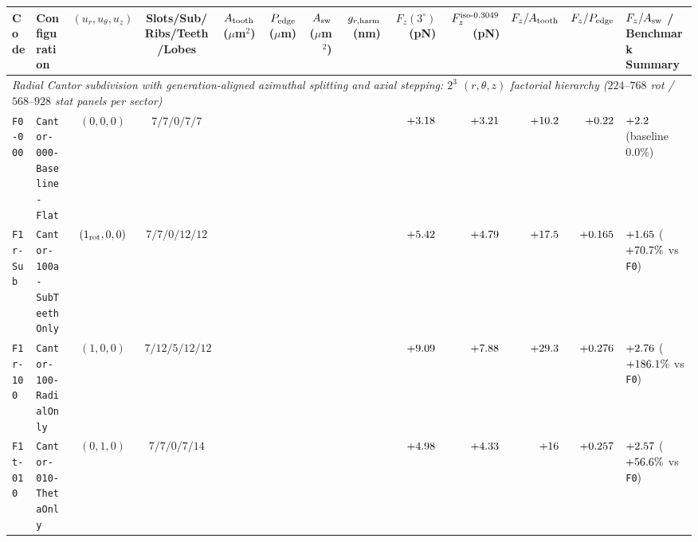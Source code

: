 \begin{table}[!htbp]
{\begin{tabular}{llccrrrrrrrrl}
\toprule
Code & Configuration & $(u_r, u_\theta, u_z)$ & Slots/Sub/Ribs/Teeth/Lobes & $A_{\rm tooth}$ ($\mu$m$^2$) & $P_{\rm edge}$ ($\mu$m) & $A_{\rm sw}$ ($\mu$m$^2$) & $g_{r,\rm harm}$ (nm) & $F_z(3^\circ)$ (pN) & $F_z^{\rm iso\text{-}0.3049}$ (pN) & $F_z/A_{\rm tooth}$ & $F_z/P_{\rm edge}$ & $F_z/A_{\rm sw}$ / Benchmark Summary \\
\midrule
\multicolumn{13}{l}{\emph{Radial Cantor subdivision with generation-aligned azimuthal splitting and axial stepping: $2^3$ $(r, \theta, z)$ factorial hierarchy ($224\text{--}768$ rot / $568\text{--}928$ stat panels per sector)}} \\
\texttt{F0-000} & \texttt{Cantor-000-Baseline-Flat} & $(0,0,0)$ & $7 / 7 / 0 / 7 / 7$ & \roundfour{\NthreeUnithreedFzerozerozeroAreaUmtwo} & \roundtwo{\NthreeUnithreedFzerozerozeroPedgeUm} & \roundtwo{\NthreeUnithreedFzerozerozeroAswUmtwo} & \roundone{\NthreeUnithreedFzerozerozeroGrHarmNm} & $+\roundtwo{\NthreeUnithreedFzerozerozeroFzPn}$ & $+\roundtwo{\NthreeIsothreezerofournineFzerozerozeroFzPn}$ & $+\roundone{\NthreeUnithreedFzerozerozeroFa}$ & $+\roundthree{\NthreeUnithreedFzerozerozeroFp}$ & $+\roundtwo{\NthreeUnithreedFzerozerozeroFasw}$ (baseline $0.0\%$) \\
\texttt{F1r-Sub} & \texttt{Cantor-100a-SubTeethOnly} & $(1_{\rm rot},0,0)$ & $7 / 7 / 0 / 12 / 12$ & \roundfour{\NthreeUnithreedFonerSubAreaUmtwo} & \roundtwo{\NthreeUnithreedFonerSubPedgeUm} & \roundtwo{\NthreeUnithreedFonerSubAswUmtwo} & \roundone{\NthreeUnithreedFonerSubGrHarmNm} & $+\roundtwo{\NthreeUnithreedFonerSubFzPn}$ & $+\roundtwo{\NthreeIsothreezerofournineFonerSubFzPn}$ & $+\roundone{\NthreeUnithreedFonerSubFa}$ & $+\roundthree{\NthreeUnithreedFonerSubFp}$ & $+\roundtwo{\NthreeUnithreedFonerSubFasw}$ ($+\roundone{\NthreeUnithreedSingleEffectRSubPct}\%$ vs \texttt{F0}) \\
\texttt{F1r-100} & \texttt{Cantor-100-RadialOnly} & $(1,0,0)$ & $7 / 12 / 5 / 12 / 12$ & \roundfour{\NthreeUnithreedFonezerozeroRAreaUmtwo} & \roundtwo{\NthreeUnithreedFonezerozeroRPedgeUm} & \roundtwo{\NthreeUnithreedFonezerozeroRAswUmtwo} & \roundone{\NthreeUnithreedFonezerozeroRGrHarmNm} & $+\roundtwo{\NthreeUnithreedFonezerozeroRFzPn}$ & $+\roundtwo{\NthreeIsothreezerofournineFonezerozeroRFzPn}$ & $+\roundone{\NthreeUnithreedFonezerozeroRFa}$ & $+\roundthree{\NthreeUnithreedFonezerozeroRFp}$ & $+\roundtwo{\NthreeUnithreedFonezerozeroRFasw}$ ($+\roundone{\NthreeUnithreedSingleEffectRPct}\%$ vs \texttt{F0}) \\
\texttt{F1t-010} & \texttt{Cantor-010-ThetaOnly} & $(0,1,0)$ & $7 / 7 / 0 / 7 / 14$ & \roundfour{\NthreeUnithreedFzeroonezeroThetaAreaUmtwo} & \roundtwo{\NthreeUnithreedFzeroonezeroThetaPedgeUm} & \roundtwo{\NthreeUnithreedFzeroonezeroThetaAswUmtwo} & \roundone{\NthreeUnithreedFzeroonezeroThetaGrHarmNm} & $+\roundtwo{\NthreeUnithreedFzeroonezeroThetaFzPn}$ & $+\roundtwo{\NthreeIsothreezerofournineFzeroonezeroThetaFzPn}$ & $+\roundone{\NthreeUnithreedFzeroonezeroThetaFa}$ & $+\roundthree{\NthreeUnithreedFzeroonezeroThetaFp}$ & $+\roundtwo{\NthreeUnithreedFzeroonezeroThetaFasw}$ ($+\roundone{\NthreeUnithreedSingleEffectThetaPct}\%$ vs \texttt{F0}) \\

\end{tabular}}
\end{table}
